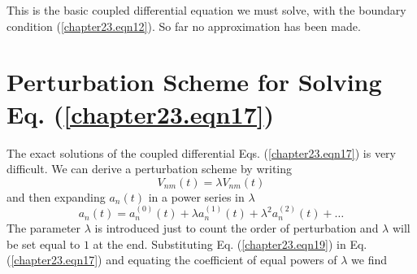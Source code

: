 This is the basic coupled differential equation we must solve, with the boundary condition (\ref{chapter23.eqn12}). So far no approximation has been made.


\section{Perturbation Scheme for Solving Eq. (\ref{chapter23.eqn17})}
The exact solutions of the coupled differential Eqs. (\ref{chapter23.eqn17}) is very difficult. We can derive a perturbation scheme by writing
\begin{equation}
V_{n m}(t) = \lambda V_{n m}(t)
\end{equation}
and then expanding $a_n(t)$ in a power series in $\lambda$
\begin{equation}
\label{chapter23.eqn19}
a_n(t) = a_n^{(0)}(t) + \lambda a^{(1)}_n (t) + \lambda^2 a^{(2)}_n (t) + \ldots
\end{equation}
The parameter $\lambda$ is introduced just to count the order of perturbation and $\lambda$ will be set equal to $1$ at the end. Substituting Eq. (\ref{chapter23.eqn19}) in Eq. (\ref{chapter23.eqn17}) and equating the coefficient of equal powers of $\lambda$ we find


